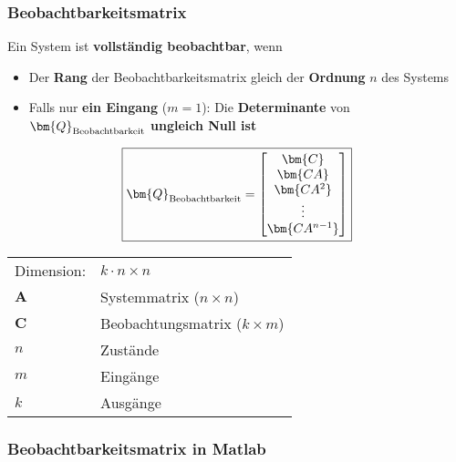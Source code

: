 

\subsubsection{Beobachtbarkeitsmatrix}

Ein System ist \textbf{vollständig beobachtbar}, wenn
\begin{itemize}
    \item Der \textbf{Rang} der Beobachtbarkeitsmatrix gleich der \textbf{Ordnung} $n$ des Systems
    \item Falls nur \textbf{ein Eingang} ($m = 1$): Die \textbf{Determinante} von $\bm{Q}_{\rm Beobachtbarkeit}$ 
        \textbf{ungleich Null ist}
\end{itemize}

\begin{minipage}[c]{0.4\columnwidth}
    $$ \boxed{ \bm{Q}_{\rm Beobachtbarkeit} = 
    \begin{bmatrix}
        \bm{C} \\ \bm{C A} \\ \bm{C A^2} \\ \vdots \\ \bm{C A^{n-1}} 
    \end{bmatrix} } $$
\end{minipage}
\hfill
\begin{minipage}[c]{0.58\columnwidth}
    \begin{tabular}{ll}
        Dimension:  & $k \cdot n \times n$ \\
        $\bm{A}$    & Systemmatrix ($n \times n$) \\
        $\bm{C}$    & Beobachtungsmatrix ($k \times m$) \\
        $n$         & Zustände \\
        $m$         & Eingänge \\
        $k$         & Ausgänge 
    \end{tabular}
\end{minipage}


\subsubsection*{Beobachtbarkeitsmatrix in Matlab}

